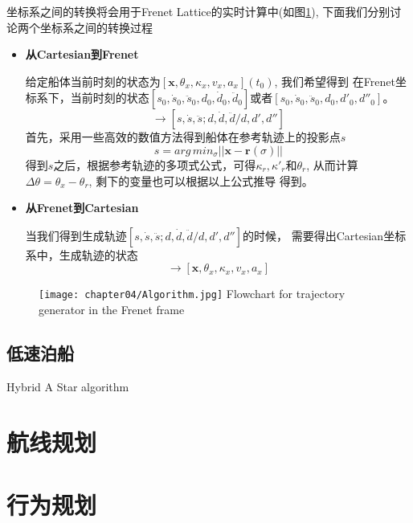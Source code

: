 坐标系之间的转换将会用于Frenet Lattice的实时计算中(如图\ref{fig:frenetalgorithm}),
下面我们分别讨论两个坐标系之间的转换过程
\begin{itemize}
  \item \textbf{从Cartesian到Frenet}

  给定船体当前时刻的状态为$[\bm{x},\theta_x, \kappa_x, v_x, a_x](t_0)$, 我们希望得到
  在Frenet坐标系下，当前时刻的状态$[s_0, \dot{s}_0, \ddot{s}_0, d_0, \dot{d}_0,
  \ddot{d}_0]$或者$[s_0, \dot{s}_0, \ddot{s}_0, d_0, d'_0, d''_0]$。
  \begin{equation}
    [\bm{x}, \theta_x, \kappa_x, v_x, a_x]  \rightarrow
    [s, \dot{s}, \ddot{s}; d, \dot{d},\ddot{d}/d, d', d'']
  \end{equation}
  首先，采用一些高效的数值方法得到船体在参考轨迹上的投影点$s$
  \begin{equation}
    s= arg\,min_{\sigma} || \bm{x}-\bm{r}(\sigma)||
  \end{equation}
  得到$s$之后，根据参考轨迹的多项式公式，可得${\kappa}_r, {\kappa}'_r$和${\theta}_r$,
  从而计算$\Delta \theta = {\theta}_x-{\theta}_r $, 剩下的变量也可以根据以上公式推导
  得到。

  \item \textbf{从Frenet到Cartesian}

  当我们得到生成轨迹$[s, \dot{s}, \ddot{s}; d, \dot{d},\ddot{d}/d, d', d'']$的时候，
  需要得出Cartesian坐标系中，生成轨迹的状态
  \begin{equation}
    [s, \dot{s}, \ddot{s}; d, \dot{d},\ddot{d}/d, d', d''] \rightarrow
    [\bm{x}, \theta_x, \kappa_x, v_x, a_x]
  \end{equation}

\end{itemize}


\begin{figure}[!htp]
  \centering
  \texttt{[image: chapter04/Algorithm.jpg]}
    {Flowchart for trajectory generator in the Frenet frame}
  \label{fig:frenetalgorithm}
\end{figure}


\subsection{低速泊船}
Hybrid A Star algorithm


\section{航线规划}
\label{sec:routeplanning}


\section{行为规划}
\label{sec:behav}
